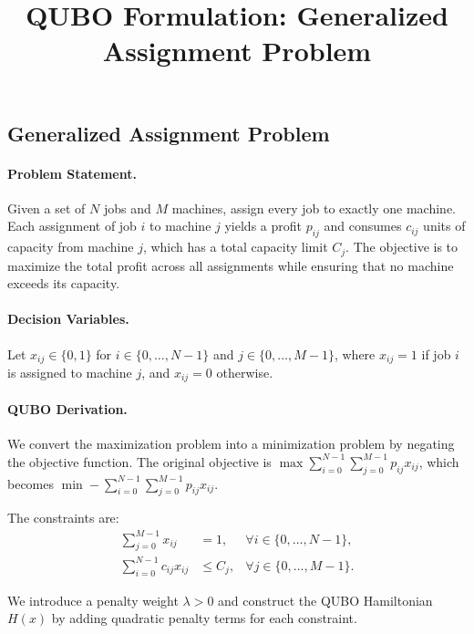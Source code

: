 \documentclass[12pt]{article}
\title{QUBO Formulation: Generalized Assignment Problem}
\date{}
\begin{document}
\maketitle

\subsection*{Generalized Assignment Problem}

\paragraph{Problem Statement.}
Given a set of $N$ jobs and $M$ machines, assign every job to exactly one machine. Each assignment of job $i$ to machine $j$ yields a profit $p_{ij}$ and consumes $c_{ij}$ units of capacity from machine $j$, which has a total capacity limit $C_j$. The objective is to maximize the total profit across all assignments while ensuring that no machine exceeds its capacity.

\paragraph{Decision Variables.}
Let $x_{ij} \in \{0,1\}$ for $i \in \{0,\dots,N-1\}$ and $j \in \{0,\dots,M-1\}$, where $x_{ij} = 1$ if job $i$ is assigned to machine $j$, and $x_{ij} = 0$ otherwise.

\paragraph{QUBO Derivation.}
We convert the maximization problem into a minimization problem by negating the objective function. The original objective is $\max \sum_{i=0}^{N-1} \sum_{j=0}^{M-1} p_{ij} x_{ij}$, which becomes $\min -\sum_{i=0}^{N-1} \sum_{j=0}^{M-1} p_{ij} x_{ij}$.

The constraints are:
\begin{align}
    \sum_{j=0}^{M-1} x_{ij} &= 1, & \forall i \in \{0,\dots,N-1\}, \\
    \sum_{i=0}^{N-1} c_{ij} x_{ij} &\le C_j, & \forall j \in \{0,\dots,M-1\}.
\end{align}

We introduce a penalty weight $\lambda > 0$ and construct the QUBO Hamiltonian $H(x)$ by adding quadratic penalty terms for each constraint.
\end{document}
